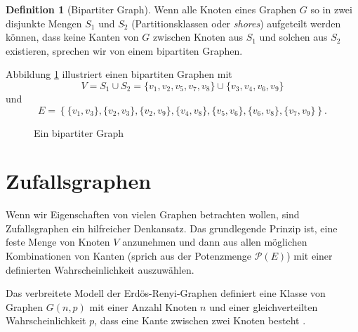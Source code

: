 \documentclass[11pt,abstracton]{scrreprt} %
\theoremstyle{definition}
\newtheorem{definition}{Definition}
\begin{document}
\begin{definition}[Bipartiter Graph]
Wenn alle Knoten eines Graphen $G$ so in zwei disjunkte Mengen $S_1$ und $S_2$ (Partitionsklassen oder {\sl shores}) aufgeteilt werden können, dass keine Kanten von $G$ zwischen Knoten aus $S_1$ und solchen aus $S_2$ existieren, sprechen wir von einem bipartiten Graphen.
\end{definition}

Abbildung \ref{bipartGraph} illustriert einen bipartiten Graphen mit
\[
	V = S_1 \cup S_2 = \{v_1,v_2,v_5,v_7,v_8\} \cup \{ v_3,v_4,v_6,v_9 \}
\]
und
\[
	E = \left\{  \{v_1,v_3\}, \{v_2,v_3\}, \{v_2,v_9\}, \{v_4,v_8\}, \{v_5,v_6\}, \{ v_6,v_8 \}, \{ v_7,v_9 \}  \right\}.
\]

\begin{figure}
\caption{Ein bipartiter Graph}
\label{bipartGraph}
\begin{center}


\end{center}
\end{figure}

\section{Zufallsgraphen}

Wenn wir Eigenschaften von vielen Graphen betrachten wollen, sind Zufallsgraphen ein hilfreicher Denkansatz. Das grundlegende Prinzip ist, eine feste Menge von Knoten $V$ anzunehmen und dann aus allen möglichen Kombinationen von Kanten (sprich aus der Potenzmenge $\mathcal{P}(E)$) mit einer definierten Wahrscheinlichkeit auszuwählen.

\bigskip
Das verbreitete Modell der Erdös-Renyi-Graphen definiert eine Klasse von Graphen $G(n, p)$ mit einer Anzahl Knoten $n$ und einer gleichverteilten Wahrscheinlichkeit $p$, dass eine Kante zwischen zwei Knoten besteht \cite{erdos}.
\end{document}
